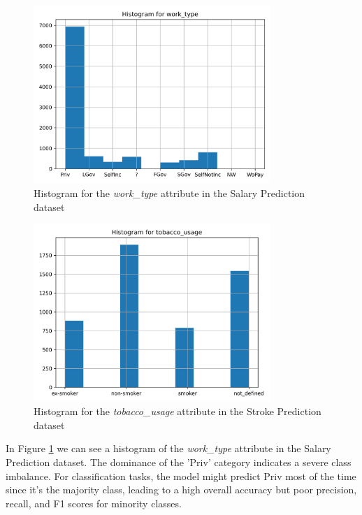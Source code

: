 \documentclass[runningheads]{paper}
\begin{document}
\begin{figure}[H]
    \centering
    \includegraphics[width=0.8\textwidth]{../plots/histogram_work_type_SalaryPrediction_full.png}
    \caption{Histogram for the \textit{work\_type} attribute in the Salary Prediction dataset}
    \label{fig:histogram_example_salary}
\end{figure}

\begin{figure}[H]
    \centering
    \includegraphics[width=0.8\textwidth]{../plots/histogram_tobacco_usage_AVC_full.png}
    \caption{Histogram for the \textit{tobacco\_usage} attribute in the Stroke Prediction dataset}
    \label{fig:histogram_example_stroke}
\end{figure}

In Figure \ref{fig:histogram_example_salary} we can see a histogram of the
\textit{work\_type} attribute in the Salary Prediction dataset. The dominance of
the 'Priv' category indicates a severe class imbalance. For classification tasks,
the model might predict Priv most of the time since it's the majority class, 
leading to a high overall accuracy but poor precision, recall, and F1 scores 
for minority classes.
\end{document}
